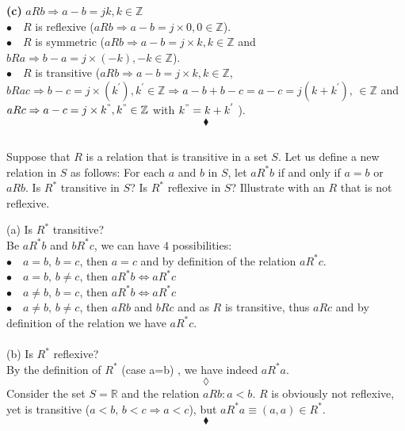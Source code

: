\textbf{(c)} $aRb \Rightarrow a-b=jk, k\in \mathbb{Z}$\\
$\bullet\quad R$ is reflexive ($aRb \Rightarrow a-b=j\times 0, 0\in \mathbb{Z}$).\\
$\bullet\quad R$ is symmetric ($aRb \Rightarrow a-b=j\times k, k\in \mathbb{Z}$ and $bRa \Rightarrow b-a=j\times (-k), -k\in \mathbb{Z}$).\\
$\bullet\quad R$ is transitive ($aRb \Rightarrow a-b=j\times k, k\in \mathbb{Z}$,  $bRac \Rightarrow b-c=j\times (k^{'}), k^{'}\in \mathbb{Z} \Rightarrow a-b+b-c= a-c = j( k+k^{'}),\, \in \mathbb{Z}$ and $aRc \Rightarrow a-c=j\times k^{"}, k^{"}\in \mathbb{Z}$ with $ k^{"}= k+k^{'}$ ).
$$\blacklozenge$$


\subsection{}
\begin{tcolorbox}
Suppose that $R$ is a relation that is transitive in a set $S$. Let us define a new relation in $S$ as follows: For each $a$ and $b$ in $S$, let $a R^{*}b$ if and only if $a=b$ or $a R b$. Is  $R^{*}$ transitive in $S$? Is $R^{*}$ reflexive in $S$? Illustrate with an $R$ that is not reflexive. 
\end{tcolorbox}
$$ $$
(a) Is $R^*$ transitive?\\
Be $aR^* b$ and $bR^* c$, we can have $4$ possibilities: \\
$\bullet\quad a=b,\, b=c$, then $a=c$ and by definition of the relation $aR^* c$.\\
$\bullet\quad a=b,\, b\neq c$, then $aR^* b\Leftrightarrow aR^* c$\\
$\bullet\quad a\neq b,\, b= c$, then $aR^* b\Leftrightarrow aR^* c$\\
$\bullet\quad a\neq b,\, b\neq c$, then $aR b$ and $  bR c$ and as $R$ is transitive, thus $aR c$ and by definition of the relation we have $aR^* c$.\\\\
(b) Is $R^*$ reflexive?\\
By the definition of $R^*$ (case a=b) , we have indeed $aR^* a$.
$$\lozenge$$
Consider the set $S= \mathbb{R}$ and the relation $aRb: a<b$. $R$ is obviously not reflexive, yet is transitive ($a<b,\, b<c\Rightarrow a<c$), but  $aR^* a\equiv (a,a)\in R^*$.
$$\blacklozenge$$

